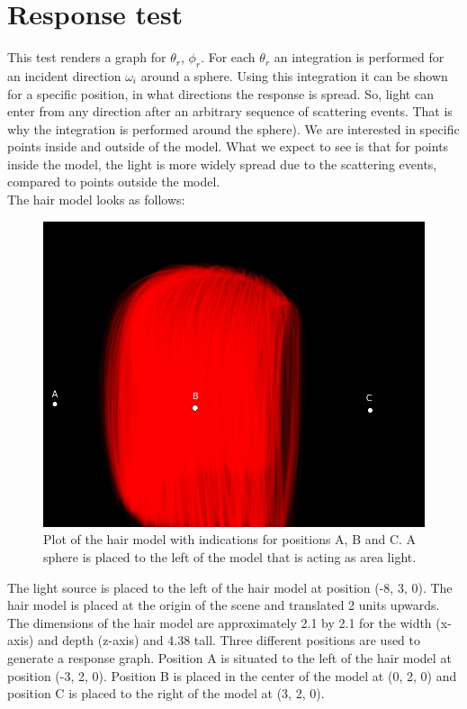 \documentclass[11pt,a4paper]{article}
\begin{document}
\section*{Response test}

This test renders a graph for $\theta_r$, $\phi_r$. For each $\theta_r$ an integration is performed for an incident direction $\omega_i$ around a sphere. Using this integration it can be shown for a specific position, in what directions the response is spread. So, light can enter from any direction after an arbitrary sequence of scattering events. That is why the integration is performed around the sphere). We are interested in specific points inside and outside of the model. What we expect to see is that for points inside the model, the light is more widely spread due to the scattering events, compared to points outside the model.\\

The hair model looks as follows:

\begin{figure}[h]
\begin{center}
\includegraphics[scale=0.5]{hairmodel.jpg}
\caption{Plot of the hair model with indications for positions A, B and C. A sphere is placed to the left of the model that is acting as area light.}
\end{center}
\end{figure}

The light source is placed to the left of the hair model at position (-8, 3, 0). 
The hair model is placed at the origin of the scene and translated 2 units upwards. The dimensions of the hair model are approximately 2.1 by 2.1 for the width (x-axis) and depth (z-axis) and 4.38 tall. Three different positions are used to generate a response graph. Position A is situated to the left of the hair model at position (-3, 2, 0). Position B is placed in the center of the model at (0, 2, 0) and position C is placed to the right of the model at (3, 2, 0).
\end{document}
